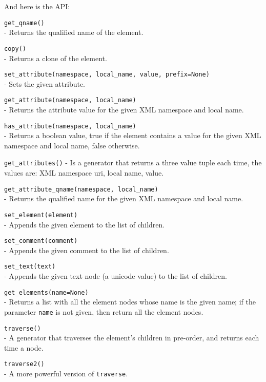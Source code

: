 And here is the API:

\begin{api}
    {\tt get\_qname()}\\
    - Returns the qualified name of the element.

    {\tt copy()}\\
    - Returns a clone of the element.

    {\tt set\_attribute(namespace, local\_name, value, prefix=None)}\\
    - Sets the given attribute.

    {\tt get\_attribute(namespace, local\_name)}\\
    - Returns the attribute value for the given XML namespace and local name.

    {\tt has\_attribute(namespace, local\_name)}\\
    - Returns a boolean value, true if the element contains a value for the
      given XML namespace and local name, false otherwise.

    {\tt get\_attributes()}
    - Is a generator that returns a three value tuple each time, the values
      are: XML namespace uri, local name, value.

    {\tt get\_attribute\_qname(namespace, local\_name)}\\
    - Returns the qualified name for the given XML namespace and local name.

    {\tt set\_element(element)}\\
    - Appends the given element to the list of children.

    {\tt set\_comment(comment)}\\
    - Appends the given comment to the list of children.

    {\tt set\_text(text)}\\
    - Appends the given text node (a unicode value) to the list of children.

    {\tt get\_elements(name=None)}\\
    - Returns a list with all the element nodes whose name is the given
    name; if the parameter {\tt name} is not given, then return all the
    element nodes.

    {\tt traverse()}\\
    - A generator that traverses the element's children in pre-order, and
      returns each time a node.

    {\tt traverse2()}\\
    - A more powerful version of {\tt traverse}.
\end{api}


